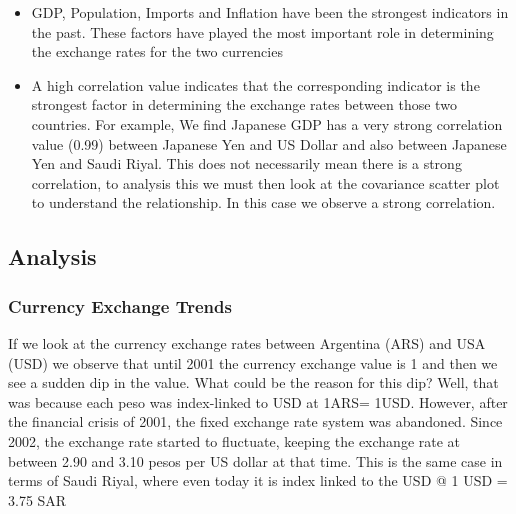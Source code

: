 \begin{itemize}
\item GDP, Population, Imports and Inflation have been the strongest indicators in the past\cite{edwards2006relationship}. These factors have played the most important role in determining the exchange rates for the two currencies
\item A high correlation value indicates that the corresponding indicator is the strongest factor in determining the exchange rates between those two countries\cite{burstein2005large}. For example, We find Japanese GDP has a very strong correlation value (0.99) between Japanese Yen and US Dollar and also between Japanese Yen and Saudi Riyal.  This does not necessarily mean there is a strong correlation, to analysis this we must then look at the covariance scatter plot to understand the relationship. In this case we observe a strong correlation. %
\end{itemize}
\subsection{Analysis}
\subsubsection{Currency Exchange Trends}
If we look at the currency exchange rates between Argentina (ARS) and USA (USD) we observe that until 2001 the currency exchange value is 1 and then we see a sudden dip in the value. What could be the reason for this dip? Well, that was because each peso was index-linked to USD at 1ARS= 1USD. However, after the financial crisis of 2001, the fixed exchange rate system was abandoned. Since 2002, the exchange rate started to fluctuate, keeping the exchange rate at between 2.90 and 3.10 pesos per US dollar at that time.  
This is the same case in terms of Saudi Riyal, where even today it is index linked to the USD @ 1 USD = 3.75 SAR 
